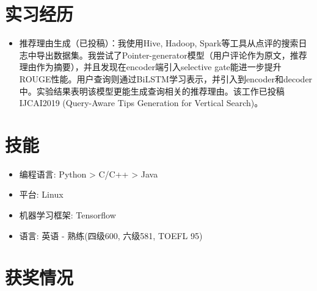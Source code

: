\documentclass{resume}
\begin{document}
\section{实习经历}
\begin{itemize}
\item 推荐理由生成（已投稿）：我使用Hive, Hadoop, Spark等工具从点评的搜索日志中导出数据集。我尝试了Pointer-generator模型（用户评论作为原文，推荐理由作为摘要），并且发现在encoder端引入selective gate能进一步提升ROUGE性能。用户查询则通过BiLSTM学习表示，并引入到encoder和decoder中。实验结果表明该模型更能生成查询相关的推荐理由。该工作已投稿IJCAI2019 (Query-Aware Tips Generation for Vertical Search)。

\end{itemize}


\section{技能}
\begin{itemize}[parsep=0.5ex]
  \item 编程语言: Python > C/C++ > Java
  \item 平台: Linux
  \item 机器学习框架: Tensorflow
  \item 语言: 英语 - 熟练(四级600, 六级581, TOEFL 95)

\end{itemize}

\section{获奖情况}

%
%
\end{document}
